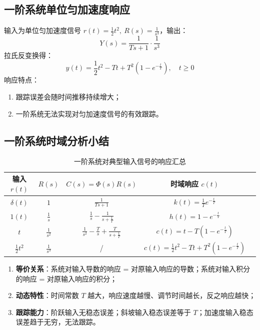 \subsection{一阶系统单位匀加速度响应}
输入为单位匀加速度信号 $r(t)=\frac12 t^2,\ R(s)=\frac{1}{s^3}$，输出：
\[
Y(s)=\frac{1}{Ts+1}\cdot\frac{1}{s^3}
\]
拉氏反变换得：
\[
y(t)=\frac12 t^2-Tt+T^2\left(1-e^{-\frac{t}{T}}\right),\quad t\ge 0
\]
响应特点：
\begin{enumerate}
    \item 跟踪误差会随时间推移持续增大；
    \item 一阶系统无法实现对匀加速度信号的有效跟踪。
\end{enumerate}

\subsection{一阶系统时域分析小结}
\begin{table}[htbp]
\centering
\caption{一阶系统对典型输入信号的响应汇总}
\begin{tabular}{ccccc}
\toprule
输入 $r(t)$ & $R(s)$ & $C(s)=\Phi(s)R(s)$ & 时域响应 $c(t)$ \\
\midrule
$\delta(t)$ & $1$ & $\displaystyle\frac{1}{Ts+1}$ & $\displaystyle k(t)=\frac{1}{T}e^{-\frac{t}{T}}$ \\
$1(t)$ & $\displaystyle\frac{1}{s}$ & $\displaystyle\frac{1}{s}-\frac{1}{s+\frac{1}{T}}$ & $\displaystyle h(t)=1-e^{-\frac{t}{T}}$ \\
$t$ & $\displaystyle\frac{1}{s^2}$ & $\displaystyle\frac{1}{s^2}-\frac{T}{s}+\frac{T}{s+\frac{1}{T}}$ & $\displaystyle c(t)=t-T\left(1-e^{-\frac{t}{T}}\right)$ \\
$\frac12 t^2$ & $\displaystyle\frac{1}{s^3}$ & / & $\displaystyle c(t)=\frac12 t^2-Tt+T^2\left(1-e^{-\frac{t}{T}}\right)$ \\
\bottomrule
\end{tabular}
\end{table}
\begin{enumerate}
    \item \textbf{等价关系}：系统对输入导数的响应 = 对原输入响应的导数；系统对输入积分的响应 = 对原输入响应的积分；
    \item \textbf{动态特性}：时间常数 $T$ 越大，响应速度越慢、调节时间越长，反之响应越快；
    \item \textbf{跟踪能力}：阶跃输入无稳态误差；斜坡输入稳态误差等于 $T$；加速度输入稳态误差趋于无穷，无法跟踪。
\end{enumerate}

